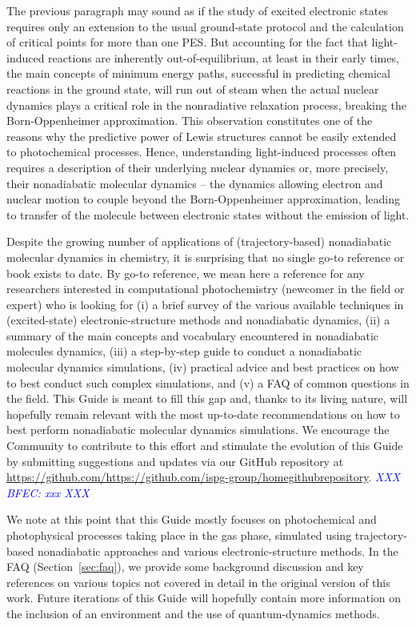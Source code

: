 \documentclass[9pt,bestpractices]{livecoms}
\newcommand{\githubrepository}{\url{https://github.com/https://github.com/ispg-group/homegithubrepository}}  %
\newcommand\bfec[1]{\textcolor{blue}{\textit{ XXX BFEC: #1 XXX }}}
\begin{document}
The previous paragraph may sound as if the study of excited electronic states requires only an extension to the usual ground-state protocol and the calculation of critical points for more than one PES. But accounting for the fact that light-induced reactions are inherently out-of-equilibrium, at least in their early times, the main concepts of minimum energy paths, successful in predicting chemical reactions in the ground state, will run out of steam when the actual nuclear dynamics plays a critical role in the nonradiative relaxation process, breaking the Born-Oppenheimer approximation.\cite{levine2007isomerization} This observation constitutes one of the reasons why the predictive power of Lewis structures cannot be easily extended to photochemical processes. Hence, understanding light-induced processes often requires a description of their underlying nuclear dynamics or, more precisely, their nonadiabatic molecular dynamics -- the dynamics allowing electron and nuclear motion to couple beyond the Born-Oppenheimer approximation, leading to transfer of the molecule between electronic states without the emission of light.

Despite the growing number of applications of (trajectory-based) nonadiabatic molecular dynamics in chemistry, it is surprising that no single go-to reference or book exists to date. By go-to reference, we mean here a reference for any researchers interested in computational photochemistry (newcomer in the field or expert) who is looking for (i) a brief survey of the various available techniques in (excited-state) electronic-structure methods and nonadiabatic dynamics, (ii) a summary of the main concepts and vocabulary encountered in nonadiabatic molecules dynamics, (iii) a step-by-step guide to conduct a nonadiabatic molecular dynamics simulations, (iv) practical advice and best practices on how to best conduct such complex simulations, and (v) a FAQ of common questions in the field. This Guide is meant to fill this gap and, thanks to its living nature, will hopefully remain relevant with the most up-to-date recommendations on how to best perform nonadiabatic molecular dynamics simulations. We encourage the Community to contribute to this effort and stimulate the evolution of this Guide by submitting suggestions and updates via our GitHub repository at \githubrepository. \bfec{xxx}

We note at this point that this Guide mostly focuses on photochemical and photophysical processes taking place in the gas phase, simulated using trajectory-based nonadiabatic approaches and various electronic-structure methods. In the FAQ (Section~\ref{sec:faq}), we provide some background discussion and key references on various topics not covered in detail in the original version of this work. Future iterations of this Guide will hopefully contain more information on the inclusion of an environment and the use of quantum-dynamics methods. 
\end{document}
